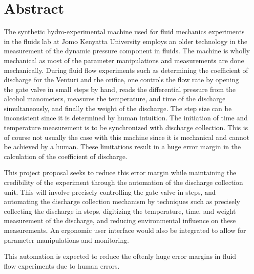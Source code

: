 \section*{Abstract}
\label{sec:}
The synthetic hydro-experimental machine used for fluid mechanics experiments in the fluids lab at Jomo Kenyatta University employs an older technology in the measurement of the dynamic pressure component in fluids. The machine is wholly mechanical as most of the parameter manipulations and measurements are done mechanically. During fluid flow experiments such as determining the coefficient of discharge for the Venturi and the orifice, one controls the flow rate by opening the gate valve in small steps by hand, reads the differential pressure from the alcohol manometers, measures the temperature, and time of the discharge simultaneously, and finally the weight of the discharge. The step size can be inconsistent since it is determined by human intuition. The initiation of time and temperature measurement is to be synchronized with discharge collection. This is of course not usually the case with this machine since it is mechanical and cannot be achieved by a human.  These limitations result in a huge error margin in the calculation of the coefficient of discharge.
\par
This project proposal seeks to reduce this error margin while maintaining the credibility of the experiment through the automation of the discharge collection unit. This will involve precisely controlling the gate valve in steps, and automating the discharge collection mechanism by techniques such as precisely collecting the discharge in steps, digitizing the temperature, time, and weight measurement of the discharge, and reducing environmental influence on these measurements.  An ergonomic user interface would also be integrated to allow for parameter manipulations and monitoring.
\par
This automation is expected to reduce the oftenly huge error margins in fluid flow experiments due to human errors.